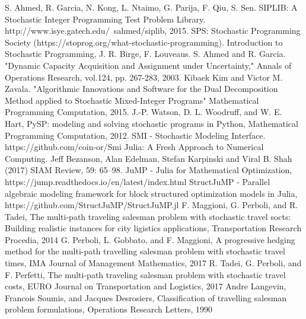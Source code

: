 \begin{thebibliography}{9} 
	S. Ahmed, R. Garcia, N. Kong, L. Ntaimo, G. Parija, F. Qiu, S. Sen. SIPLIB: A Stochastic Integer Programming Test Problem Library. http://www.isye.gatech.edu/~sahmed/siplib, 2015.
	SPS: Stochastic Programming Society (https://stoprog.org/what-stochastic-programming).
	Introduction to Stochastic Programming, J. R. Birge, F. Louveaus.
	S. Ahmed and R. Garcia. "Dynamic Capacity Acquisition and Assignment under Uncertainty," Annals of Operations Research, vol.124, pp. 267-283, 2003.
	Kibaek Kim and Victor M. Zavala. "Algorithmic Innovations and Software for the Dual Decomposition Method applied to Stochastic Mixed-Integer Programs" Mathematical Programming Computation, 2015.
	J.-P. Watson, D. L. Woodruff, and W. E. Hart, PySP: modeling and solving stochastic programs in Python, Mathematical Programming Computation, 2012.
	SMI - Stochastic Modeling Interface. https://github.com/coin-or/Smi
	Julia: A Fresh Approach to Numerical Computing. Jeff Bezanson, Alan Edelman, Stefan Karpinski and Viral B. Shah (2017) SIAM Review, 59: 65–98.
	JuMP - Julia for Mathematical Optimization, https://jump.readthedocs.io/en/latest/index.html
	StructJuMP - Parallel algebraic modeling framework for block structured optimization models in Julia, https://github.com/StructJuMP/StructJuMP.jl
	F. Maggioni, G. Perboli, and R. Tadei, The multi-path traveling salesman problem with stochastic travel socts: Building realistic instances for city ligistics applications, Transportation Research Procedia, 2014
	G. Perboli, L. Gobbato, and F. Maggioni, A progressive hedging method for the multi-path travelling salesman problem with stochastic travel times, IMA Journal of Management Mathematics, 2017
	R. Tadei, G. Perboli, and F. Perfetti, The multi-path traveling salesman problem with stochastic travel costs, EURO Journal on Transportation and Logistics, 2017
	Andre Langevin, Francois Soumis, and Jacques Desrosiers, Classification of travelling salesman problem formulations, Operations Research Letters, 1990

\end{thebibliography}
